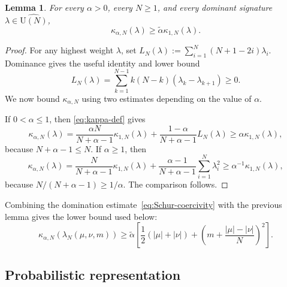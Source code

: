 \documentclass[11pt,a4paper,reqno]{article}
\newtheorem{lemma}[theorem]{Lemma}
\theoremstyle{definition}
\theoremstyle{remark}
\newcommand\U{{\mathrm U}}
\begin{document}
\begin{lemma}\label{lem:Jack-coercivity}
For every $\alpha>0$, every $N\geq1$, and every dominant signature $\lambda\in\widehat{\U(N)}$,
\begin{equation}
\kappa_{\alpha,N}(\lambda)\geq \widetilde\alpha\kappa_{1,N}(\lambda).
\end{equation}

\end{lemma}

\begin{proof}
For any highest weight $\lambda$, set $L_N(\lambda):=\sum_{i=1}^N(N+1-2i)\lambda_i$.  Dominance gives the useful identity and lower bound
\begin{equation}\label{eq:weyl-linear-positive}
L_N(\lambda)=\sum_{k=1}^{N-1}k(N-k)(\lambda_k-\lambda_{k+1})\geq 0.
\end{equation}
We now bound $\kappa_{\alpha,N}$ using two estimates depending on the value of $\alpha$.

If $0<\alpha\leq1$, then \eqref{eq:kappa-def} gives
\[
\kappa_{\alpha,N}(\lambda) =\frac{\alpha N}{N+\alpha-1}\kappa_{1,N}(\lambda) +\frac{1-\alpha}{N+\alpha-1}L_N(\lambda) \geq \alpha\kappa_{1,N}(\lambda),
\]
because $N+\alpha-1\leq N$.  If $\alpha\geq1$, then
\[
\kappa_{\alpha,N}(\lambda) =\frac{N}{N+\alpha-1}\kappa_{1,N}(\lambda) +\frac{\alpha-1}{N+\alpha-1}\sum_{i=1}^N\lambda_i^2 \geq \alpha^{-1}\kappa_{1,N}(\lambda),
\]
because $N/(N+\alpha-1)\geq1/\alpha$.  The comparison follows.
\end{proof}

Combining the domination estimate~\eqref{eq:Schur-coercivity} with the previous lemma gives the lower bound used below:
\begin{equation}\label{eq:Jack-lower}
\kappa_{\alpha,N}(\lambda_N(\mu,\nu,m)) \geq \widetilde\alpha\left[ \frac12(|\mu|+|\nu|) +\left(m+\frac{|\mu|-|\nu|}{N}\right)^2 \right].
\end{equation}

\subsection{Probabilistic representation}\label{subsec:probabilistic-representation}
\end{document}
